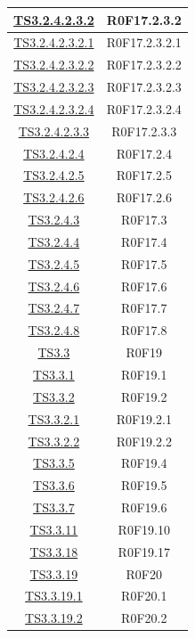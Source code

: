 \documentclass[../PianoDiQualifica.tex]{subfiles}
\begin{document}
\begin{longtable}{|c|c|}
		\hline
		\hyperlink{TS3.2.4.2.3.2}{TS3.2.4.2.3.2} & R0F17.2.3.2   \\
		\hline
		\hyperlink{TS3.2.4.2.3.2.1}{TS3.2.4.2.3.2.1} & R0F17.2.3.2.1   \\
		\hline
		\hyperlink{TS3.2.4.2.3.2.2}{TS3.2.4.2.3.2.2} & R0F17.2.3.2.2   \\
		\hline
		\hyperlink{TS3.2.4.2.3.2.3}{TS3.2.4.2.3.2.3} & R0F17.2.3.2.3   \\
		\hline
		\hyperlink{TS3.2.4.2.3.2.4}{TS3.2.4.2.3.2.4} & R0F17.2.3.2.4   \\
		\hline
		\hyperlink{TS3.2.4.2.3.3}{TS3.2.4.2.3.3} & R0F17.2.3.3   \\
		\hline
		\hyperlink{TS3.2.4.2.4}{TS3.2.4.2.4} & R0F17.2.4   \\
		\hline
		\hyperlink{TS3.2.4.2.5}{TS3.2.4.2.5} & R0F17.2.5   \\
		\hline
		\hyperlink{TS3.2.4.2.6}{TS3.2.4.2.6} & R0F17.2.6   \\
		\hline
		\hyperlink{TS3.2.4.3}{TS3.2.4.3} & R0F17.3   \\
		\hline
		\hyperlink{TS3.2.4.4}{TS3.2.4.4} & R0F17.4   \\
		\hline
		\hyperlink{TS3.2.4.5}{TS3.2.4.5} & R0F17.5   \\
		\hline
		\hyperlink{TS3.2.4.6}{TS3.2.4.6} & R0F17.6   \\
		\hline
		\hyperlink{TS3.2.4.7}{TS3.2.4.7} & R0F17.7   \\
		\hline
		\hyperlink{TS3.2.4.8}{TS3.2.4.8} & R0F17.8   \\
		\hline
		\hyperlink{TS3.3}{TS3.3} & R0F19   \\
		\hline
		\hyperlink{TS3.3.1}{TS3.3.1} & R0F19.1   \\
		\hline
		\hyperlink{TS3.3.2}{TS3.3.2} & R0F19.2   \\
		\hline
		\hyperlink{TS3.3.2.1}{TS3.3.2.1} & R0F19.2.1   \\
		\hline
		\hyperlink{TS3.3.2.2}{TS3.3.2.2} & R0F19.2.2   \\
		\hline
	
		\hyperlink{TS3.3.5}{TS3.3.5} & R0F19.4   \\
		\hline
		\hyperlink{TS3.3.6}{TS3.3.6} & R0F19.5   \\
		\hline
		\hyperlink{TS3.3.7}{TS3.3.7} & R0F19.6   \\
		\hline
	
		\hyperlink{TS3.3.11}{TS3.3.11} & R0F19.10   \\
		\hline
	
		\hyperlink{TS3.3.18}{TS3.3.18} & R0F19.17   \\
		\hline
		\hyperlink{TS3.3.19}{TS3.3.19} & R0F20   \\
		\hline
		\hyperlink{TS3.3.19.1}{TS3.3.19.1} & R0F20.1   \\
		\hline
		\hyperlink{TS3.3.19.2}{TS3.3.19.2} & R0F20.2   \\
		\hline
	

\end{longtable}
\end{document}
